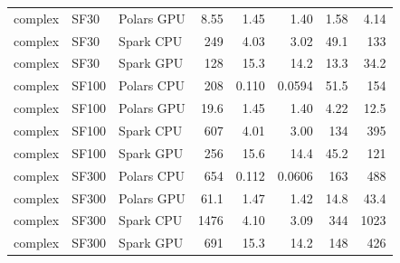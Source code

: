 \begin{longtable}{lllrrrrr}
complex & SF30 & Polars GPU & 8.55 & 1.45 & 1.40 & 1.58 & 4.14 \\
complex & SF30 & Spark CPU & 249 & 4.03 & 3.02 & 49.1 & 133 \\
complex & SF30 & Spark GPU & 128 & 15.3 & 14.2 & 13.3 & 34.2 \\
complex & SF100 & Polars CPU & 208 & 0.110 & 0.0594 & 51.5 & 154 \\
complex & SF100 & Polars GPU & 19.6 & 1.45 & 1.40 & 4.22 & 12.5 \\
complex & SF100 & Spark CPU & 607 & 4.01 & 3.00 & 134 & 395 \\
complex & SF100 & Spark GPU & 256 & 15.6 & 14.4 & 45.2 & 121 \\
complex & SF300 & Polars CPU & 654 & 0.112 & 0.0606 & 163 & 488 \\
complex & SF300 & Polars GPU & 61.1 & 1.47 & 1.42 & 14.8 & 43.4 \\
complex & SF300 & Spark CPU & 1476 & 4.10 & 3.09 & 344 & 1023 \\
complex & SF300 & Spark GPU & 691 & 15.3 & 14.2 & 148 & 426 \\
\end{longtable}
